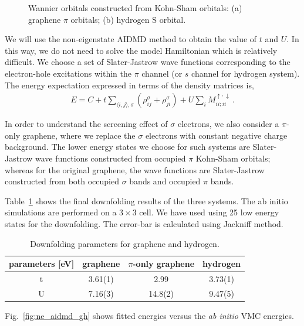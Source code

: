\begin{figure}[hbt]
  \centering  
       \caption{Wannier orbitals constructed from Kohn-Sham orbitals: (a) graphene $\pi$ orbitals; (b) hydrogen S orbital. }
\label{fig:wan}
\end{figure}

We will use the non-eigenstate AIDMD method to obtain the value of $t$ and $U$. In this way, we do not need to solve the model Hamiltonian which is relatively difficult. We choose a set of Slater-Jastrow wave functions corresponding to the electron-hole excitations within the $\pi$ channel (or $s$ channel for hydrogen system). The energy expectation expressed in terms of the density matrices is, 
\begin{eqnarray}\label{eq:en}
E = C + t\sum_{\langle i, j\rangle, \sigma}( \rho_{ij}^\sigma + \rho_{ji}^\sigma) + U \sum_{i}M_{ii;ii}^{\uparrow,\downarrow}\,.
\end{eqnarray}

In order to understand the screening effect of $\sigma$ electrons, we also consider a $\pi$-only graphene, where we replace the $\sigma$ electrons with constant negative charge background. The lower energy states we choose for such systems are Slater-Jastrow wave functions constructed from occupied $\pi$ Kohn-Sham orbitals; whereas for the original graphene, the wave functions are Slater-Jastrow constructed from both occupied $\sigma$ bands and occupied $\pi$ bands. 

Table~\ref{tab:grpheffm} shows the final downfolding results of the three systems. The ab initio simulations are performed on a $3\times3$ cell. We have used using 25 low energy states for the downfolding. The error-bar is calculated using Jackniff method. 

\begin{table}[ht]
\label{tab:grpheffm}
\centering
\begin{tabular}{|c|c|c|c|}
\hline
parameters [eV] & graphene & $\pi$-only graphene &hydrogen \\
\hline
\hline
t & 3.61(1) & 2.99 & 3.73(1)\\
U & 7.16(3) & 14.8(2) & 9.47(5)\\
\hline
\end{tabular}
\caption{Downfolding parameters for graphene and hydrogen.}
\end{table} 
Fig.~\ref{fig:ne_aidmd_gh} shows fitted energies versus the \textit{ab initio} VMC energies. 

